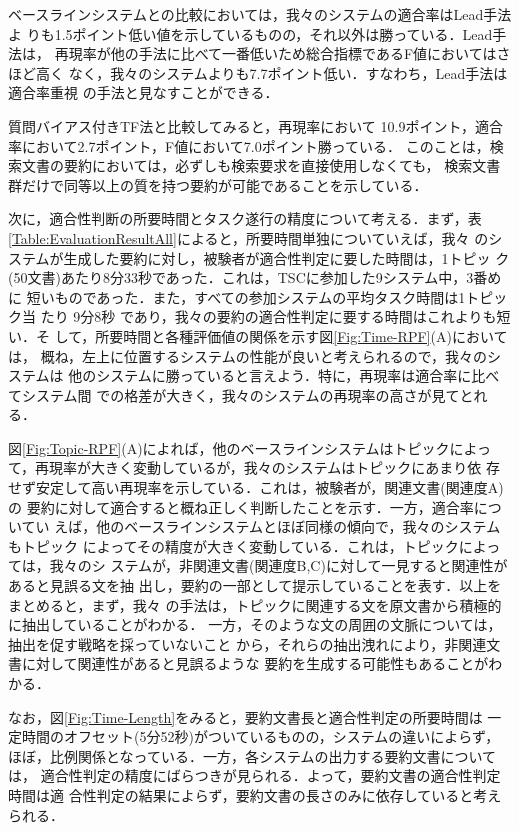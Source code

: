 ベースラインシステムとの比較においては，我々のシステムの適合率はLead手法よ
りも1.5ポイント低い値を示しているものの，それ以外は勝っている．Lead手法は，
再現率が他の手法に比べて一番低いため総合指標であるF値においてはさほど高く
なく，我々のシステムよりも7.7ポイント低い．すなわち，Lead手法は適合率重視
の手法と見なすことができる．

質問バイアス付きTF法と比較してみると，再現率において
10.9ポイント，適合率において2.7ポイント，F値において7.0ポイント勝っている．
このことは，検索文書の要約においては，必ずしも検索要求を直接使用しなくても，
検索文書群だけで同等以上の質を持つ要約が可能であることを示している．

次に，適合性判断の所要時間とタスク遂行の精度について考える．まず，表
\ref{Table:EvaluationResultAll}によると，所要時間単独についていえば，我々
のシステムが生成した要約に対し，被験者が適合性判定に要した時間は，1トピッ
ク(50文書)あたり8分33秒であった．これは，TSCに参加した9システム中，3番めに
短いものであった．また，すべての参加システムの平均タスク時間は1トピック当
たり 9分8秒 であり，我々の要約の適合性判定に要する時間はこれよりも短い．そ
して，所要時間と各種評価値の関係を示す図\ref{Fig:Time-RPF}(A)においては，
概ね，左上に位置するシステムの性能が良いと考えられるので，我々のシステムは
他のシステムに勝っていると言えよう．特に，再現率は適合率に比べてシステム間
での格差が大きく，我々のシステムの再現率の高さが見てとれる．

図\ref{Fig:Topic-RPF}(A)によれば，他のベースラインシステムはトピックによっ
て，再現率が大きく変動しているが，我々のシステムはトピックにあまり依
存せず安定して高い再現率を示している．これは，被験者が，関連文書(関連度A)の
要約に対して適合すると概ね正しく判断したことを示す．一方，適合率についてい
えば，他のベースラインシステムとほぼ同様の傾向で，我々のシステムもトピック
によってその精度が大きく変動している．これは，トピックによっては，我々のシ
ステムが，非関連文書(関連度B,C)に対して一見すると関連性があると見誤る文を抽
出し，要約の一部として提示していることを表す．以上をまとめると，まず，我々
の手法は，トピックに関連する文を原文書から積極的に抽出していることがわかる．
一方，そのような文の周囲の文脈については，抽出を促す戦略を採っていないこと
から，それらの抽出洩れにより，非関連文書に対して関連性があると見誤るような
要約を生成する可能性もあることがわかる．

なお，図\ref{Fig:Time-Length}をみると，要約文書長と適合性判定の所要時間は
一定時間のオフセット(5分52秒)がついているものの，システムの違いによらず，
ほぼ，比例関係となっている．一方，各システムの出力する要約文書については，
適合性判定の精度にばらつきが見られる．よって，要約文書の適合性判定時間は適
合性判定の結果によらず，要約文書の長さのみに依存していると考えられる．


